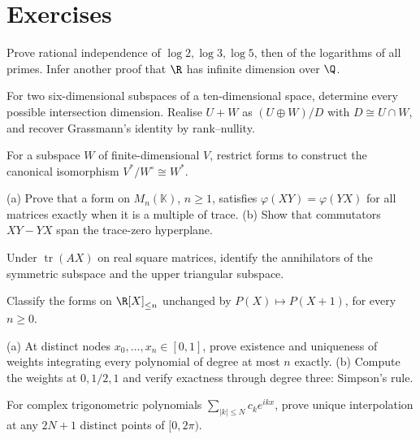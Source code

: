\section{Exercises}
\begin{exercise}[$\star$]\label{linear:ex:logs}
Prove rational independence of $\log2,\log3,\log5$, then of the logarithms of all primes. Infer another proof that $\R$ has infinite dimension over $\Q$.
\end{exercise}
\begin{exercise}[$\star$]\label{linear:ex:grassmann}
For two six-dimensional subspaces of a ten-dimensional space, determine every possible intersection dimension. Realise $U+W$ as $(U\oplus W)/D$ with $D\cong U\cap W$, and recover Grassmann's identity by rank--nullity.
\end{exercise}
\begin{exercise}[$\star$]\label{linear:ex:quotientdual}
For a subspace $W$ of finite-dimensional $V$, restrict forms to construct the canonical isomorphism $V^*/W^\circ\cong W^*$.
\end{exercise}
\begin{exercise}[$\star\star$]\label{linear:ex:traceform}
(a) Prove that a form on $M_n(\mathbb K)$, $n\ge1$, satisfies $\varphi(XY)=\varphi(YX)$ for all matrices exactly when it is a multiple of trace. (b) Show that commutators $XY-YX$ span the trace-zero hyperplane.
\end{exercise}
\begin{exercise}[$\star$]\label{linear:ex:symanti}
Under $\operatorname{tr}(AX)$ on real square matrices, identify the annihilators of the symmetric subspace and the upper triangular subspace.
\end{exercise}
\begin{exercise}[$\star\star$]\label{linear:ex:shift}
Classify the forms on $\R[X]_{\le n}$ unchanged by $P(X)\mapsto P(X+1)$, for every $n\ge0$.
\end{exercise}
\begin{exercise}[$\star\star$]\label{linear:ex:quadrature}
(a) At distinct nodes $x_0,\ldots,x_n\in[0,1]$, prove existence and uniqueness of weights integrating every polynomial of degree at most $n$ exactly. (b) Compute the weights at $0,1/2,1$ and verify exactness through degree three: Simpson's rule.
\end{exercise}
\begin{exercise}[$\star$]\label{linear:ex:trig}
For complex trigonometric polynomials $\sum_{|k|\le N}c_ke^{ikx}$, prove unique interpolation at any $2N+1$ distinct points of $[0,2\pi)$.
\end{exercise}
